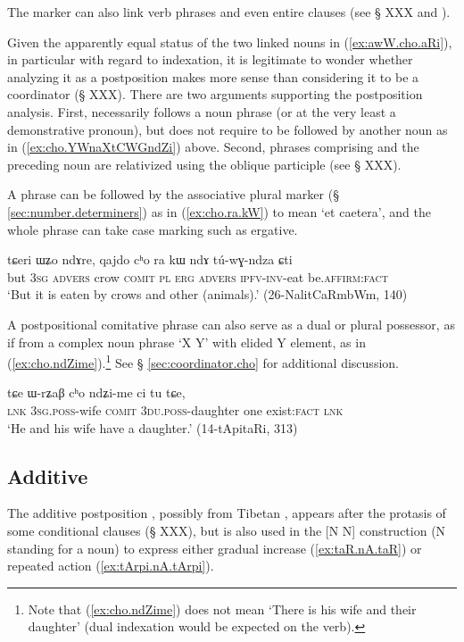 The marker  can also link verb phrases and even entire clauses (see § XXX and \citealt[313]{jacques14linking}).

Given the apparently equal status of the two linked nouns in (\ref{ex:awW.cho.aRi}), in particular with regard to indexation, it is legitimate to wonder whether analyzing it as a postposition makes more sense than considering it to be a coordinator (§ XXX). There are two arguments supporting the postposition analysis. First,  necessarily follows a noun phrase (or at the very least a demonstrative pronoun), but does not require to be followed by another noun as in (\ref{ex:cho.YWnaXtCWGndZi}) above. Second, phrases comprising  and the preceding noun are relativized using the oblique participle (see § XXX).

A  phrase can be followed by the associative plural marker  (§ \ref{sec:number.determiners}) as in (\ref{ex:cho.ra.kW}) to mean `et caetera', and the whole phrase can take case marking such as ergative.

\begin{exe}
\ex \label{ex:cho.ra.kW}
\gll tɕeri ɯʑo ndɤre, qajdo cʰo ra kɯ ndɤ tú-wɣ-ndza ɕti \\
but \textsc{3sg} \textsc{advers} crow \textsc{comit} \textsc{pl} \textsc{erg} \textsc{advers} \textsc{ipfv}-\textsc{inv}-eat be.\textsc{affirm}:\textsc{fact} \\
\glt `But it is eaten by crows and other (animals).' (26-NalitCaRmbWm, 140)
\end{exe}

A postpositional comitative phrase can also serve as a dual or plural possessor, as if from a complex noun phrase `X  Y' with elided Y element, as in (\ref{ex:cho.ndZime}).\footnote{Note that (\ref{ex:cho.ndZime}) does not mean `There is his wife and their daughter' (dual indexation would be expected on the verb).} See § \ref{sec:coordinator.cho} for additional discussion.

\begin{exe}
\ex \label{ex:cho.ndZime}
\gll tɕe ɯ-rʑaβ cʰo ndʑi-me ci tu tɕe, \\
\textsc{lnk} \textsc{3sg}.\textsc{poss}-wife \textsc{comit} \textsc{3du}.\textsc{poss}-daughter one exist:\textsc{fact} \textsc{lnk} \\
\glt `He and his wife have a daughter.' (14-tApitaRi, 313)
\end{exe}
 
 
\subsection{Additive} \label{sec:additive.nA} 
The additive postposition , possibly from Tibetan , appears after the protasis of some conditional clauses (§ XXX), but is also used in the [N  N] construction (N standing for a noun) to express either gradual increase (\ref{ex:taR.nA.taR}) or repeated action (\ref{ex:tArpi.nA.tArpi}).


